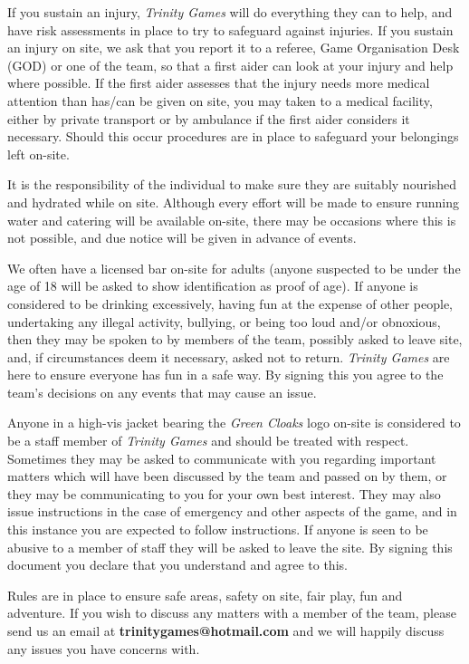 \documentclass{scrbook}
\begin{document}
If you sustain an injury, \textit{Trinity Games} will do everything they can to help, and have risk assessments in place to try to safeguard against injuries. If you sustain an injury on site, we ask that you report it to a referee, Game Organisation Desk (GOD) or one of the team, so that a first aider can look at your injury and help where possible. If the first aider assesses that the injury needs more medical attention than has/can be given on site, you may taken to a medical facility, either by private transport or by ambulance if the first aider considers it necessary. Should this occur procedures are in place to safeguard your belongings left on-site.

It is the responsibility of the individual to make sure they are suitably nourished and hydrated while on site. Although every effort will be made to ensure running water and catering will be available on-site, there may be occasions where this is not possible, and due notice will be given in advance of events.

We often have a licensed bar on-site for adults (anyone suspected to be under the age of 18 will be asked to show identification as proof of age). If anyone is considered to be drinking excessively, having fun at the expense of other people, undertaking any illegal activity, bullying, or being too loud and/or obnoxious, then they may be spoken to by members of the team, possibly asked to leave site, and, if circumstances deem it necessary, asked not to return. \textit{Trinity Games} are here to ensure everyone has fun in a safe way. By signing this you agree to the team's decisions on any events that may cause an issue.

Anyone in a high-vis jacket bearing the \textit{Green Cloaks} logo on-site is considered to be a staff member of \textit{Trinity Games} and should be treated with respect. Sometimes they may be asked to communicate with you regarding important matters which will have been discussed by the team and passed on by them, or they may be communicating to you for your own best interest. They may also issue instructions in the case of emergency and other aspects of the game, and in this instance you are expected to follow instructions. If anyone is seen to be abusive to a member of staff they will be asked to leave the site. By signing this document you declare that you understand and agree to this.

Rules are in place to ensure safe areas, safety on site, fair play, fun and adventure. If you wish to discuss any matters with a member of the team, please send us an email at \textbf{trinitygames@hotmail.com} and we will happily discuss any issues you have concerns with.
\end{document}
